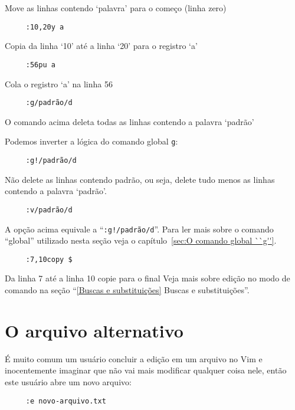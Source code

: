 Move as linhas contendo `palavra' para o começo (linha zero)


\begin{verbatim}
     :10,20y a
\end{verbatim}

Copia da linha `10' até a linha `20' para o registro `a'

\begin{verbatim}
     :56pu a
\end{verbatim}

Cola o registro `a' na linha 56

\begin{verbatim}
     :g/padrão/d
\end{verbatim}

O comando acima deleta todas as linhas contendo a palavra `padrão'

Podemos inverter a lógica do comando global \verb+g+:

\begin{verbatim}
     :g!/padrão/d
\end{verbatim}

Não delete as linhas contendo padrão, ou seja, delete tudo menos as linhas
contendo a palavra `padrão'. 

\begin{verbatim}
     :v/padrão/d
\end{verbatim}

A opção acima equivale a ``\verb+:g!/padrão/d+''.  Para ler mais sobre
o comando ``global'' utilizado nesta seção veja o capítulo~\ref{sec:O comando global ``g''}.

\begin{verbatim}
     :7,10copy $
\end{verbatim}

Da linha 7 até a linha 10 copie para o final
Veja mais sobre edição no modo de comando na seção ``\ref{Buscas e
substituições} Buscas e substituições''.

\section{O arquivo alternativo}
\label{O arquivo alternativo}

É muito comum um usuário concluir a edição em um arquivo no Vim e
inocentemente imaginar que não vai mais modificar qualquer coisa nele, então
este usuário abre um novo arquivo:

\begin{verbatim}
     :e novo-arquivo.txt
\end{verbatim}


